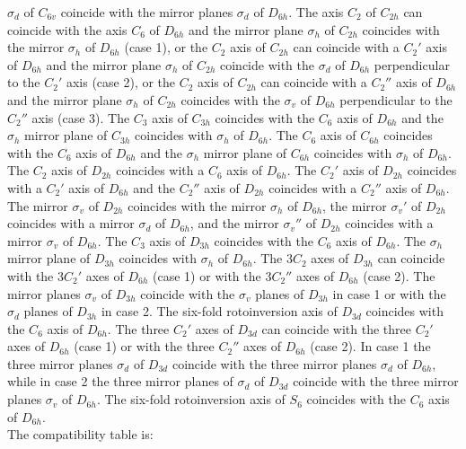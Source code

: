 \documentclass[12pt,a4paper]{article}
\begin{document}
$\sigma_d$ of $C_{6v}$ coincide with the mirror planes $\sigma_d$ of 
$D_{6h}$. The axis $C_2$ of $C_{2h}$ can coincide with the axis $C_6$
of $D_{6h}$ and the mirror plane $\sigma_h$ of $C_{2h}$ coincides with
the mirror $\sigma_h$ of $D_{6h}$ (case 1), or the $C_2$ axis of 
$C_{2h}$ can coincide with a $C_2'$ axis of $D_{6h}$ and the mirror
plane $\sigma_h$ of $C_{2h}$ coincide with the $\sigma_d$ of $D_{6h}$
perpendicular to the $C_2'$ axis (case 2), or the $C_2$ axis of
$C_{2h}$ can coincide with a $C_2''$ axis of $D_{6h}$ and the
mirror plane $\sigma_h$ of $C_{2h}$ coincides with the $\sigma_v$ of $D_{6h}$ 
perpendicular to the $C_2''$ axis (case 3). The $C_3$ axis of $C_{3h}$
coincides with the $C_6$ axis of $D_{6h}$ and the $\sigma_h$ mirror plane
of $C_{3h}$ coincides with $\sigma_h$ of $D_{6h}$.
The $C_6$ axis of $C_{6h}$ coincides with the $C_6$ axis of $D_{6h}$ 
and the $\sigma_h$ mirror plane
of $C_{6h}$ coincides with $\sigma_h$ of $D_{6h}$.
The $C_2$ axis of $D_{2h}$ coincides with a $C_6$ axis of $D_{6h}$. The $C_2'$ 
axis of $D_{2h}$ coincides with a $C_2'$ axis of $D_{6h}$ and the $C_2''$ axis of 
$D_{2h}$ coincides with a $C_2''$ axis of $D_{6h}$. The mirror $\sigma_v$ of 
$D_{2h}$ coincides with the mirror $\sigma_h$ of $D_{6h}$, the mirror $\sigma_v'$ 
of $D_{2h}$ coincides with a mirror $\sigma_d$ of $D_{6h}$, and the mirror
$\sigma_v''$ of $D_{2h}$ coincides with a mirror $\sigma_v$ of $D_{6h}$. 
The $C_3$ axis of $D_{3h}$ coincides with the $C_6$ axis of $D_{6h}$.
The $\sigma_h$ mirror plane of $D_{3h}$ coincides with $\sigma_h$ 
of $D_{6h}$. The $3C_2$ axes of $D_{3h}$ can coincide with the
$3C_2'$ axes of $D_{6h}$ (case 1) or with the $3C_2''$ axes of $D_{6h}$ 
(case 2). The mirror planes $\sigma_v$ of $D_{3h}$ coincide with the 
$\sigma_v$ planes of $D_{3h}$ in case 1 or with the $\sigma_d$ planes of 
$D_{3h}$ in case 2. The six-fold rotoinversion axis of $D_{3d}$ coincides with the 
$C_6$ axis of $D_{6h}$. The three $C_2'$ axes of $D_{3d}$ can coincide
with the three $C_2'$ axes of $D_{6h}$ (case 1) or with the three $C_2''$ 
axes of $D_{6h}$ (case 2). In case 1 the three mirror planes $\sigma_d$
of $D_{3d}$ coincide with the three mirror planes $\sigma_d$ of $D_{6h}$, 
while in case 2 the three mirror planes of $\sigma_d$
of $D_{3d}$ coincide with the three mirror planes $\sigma_v$ of $D_{6h}$.
The six-fold rotoinversion axis of $S_6$ coincides with the $C_6$ axis of $D_{6h}$.
\\
The compatibility table is:
\end{document}
